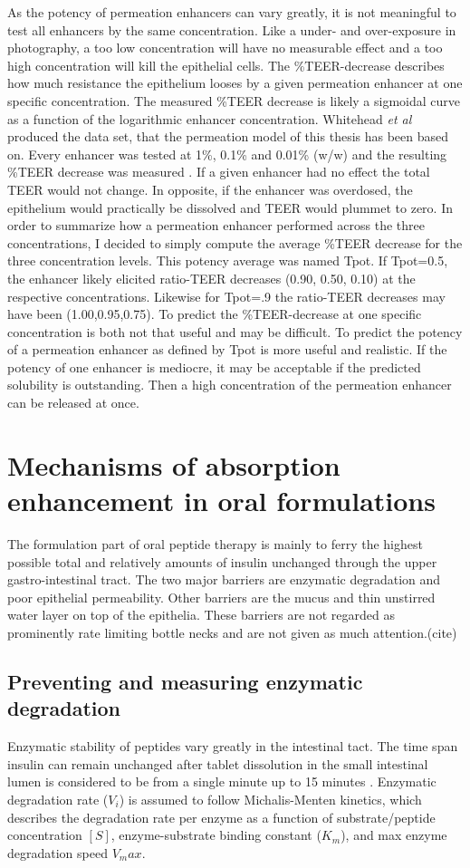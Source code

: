 As the potency of permeation enhancers can vary greatly, it is not meaningful to test all enhancers by the same concentration. Like a under- and over-exposure in photography, a too low concentration will have no measurable effect and a too high concentration will kill the epithelial cells. The \%TEER-decrease describes how much resistance the epithelium looses by a given permeation enhancer at one specific concentration. The measured \%TEER decrease is likely a sigmoidal curve as a function of the logarithmic enhancer concentration. Whitehead \textit{et al} produced the data set, that the permeation model of this thesis has been based on. Every enhancer was tested at 1\%, 0.1\% and 0.01\% (w/w) and the resulting \%TEER decrease was measured \cite{whitehead2008safe}. If a given enhancer had no effect the total TEER would not change. In opposite, if the enhancer was overdosed, the epithelium would practically be dissolved and TEER would plummet to zero. In order to summarize how a permeation enhancer performed across the three concentrations, I decided to simply compute the average \%TEER decrease for the three concentration levels. This potency average was named Tpot. If Tpot=0.5, the enhancer likely elicited ratio-TEER decreases (0.90, 0.50, 0.10) at the respective concentrations. Likewise for Tpot=.9 the ratio-TEER decreases may have been (1.00,0.95,0.75). To predict the \%TEER-decrease at one specific concentration is both not that useful and may be difficult. To predict the potency of a permeation enhancer as defined by Tpot is more useful and realistic. If the potency of one enhancer is mediocre, it may be acceptable if the predicted solubility is outstanding. Then a high concentration of the permeation enhancer can be released at once.

\section{Mechanisms of absorption enhancement in oral formulations}
The formulation part of oral peptide therapy is mainly to ferry the highest possible total and relatively amounts of insulin unchanged through the upper gastro-intestinal tract. The two major barriers are enzymatic degradation and poor epithelial permeability. Other barriers are the mucus and thin unstirred water layer on top of the epithelia. These barriers are not regarded as prominently rate limiting bottle necks and are not given as much attention.(cite)

\subsection{Preventing and measuring enzymatic degradation}
Enzymatic stability of peptides vary greatly in the intestinal tact. The time span insulin can remain unchanged after tablet dissolution in the small intestinal lumen is considered to be from a single minute up to 15 minutes \cite{welling2014citric}. Enzymatic degradation rate ($V_i$) is assumed to follow Michalis-Menten kinetics, which describes the degradation rate per enzyme as a function of substrate/peptide concentration $[S]$, enzyme-substrate binding constant ($K_m$), and max enzyme degradation speed $V_max$.


